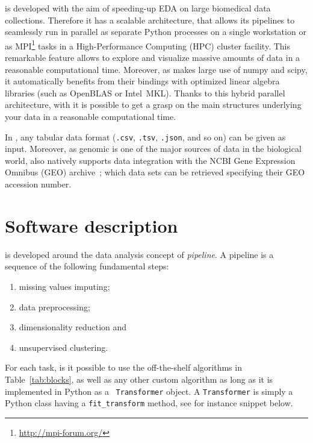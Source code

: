 \ade is developed with the aim of speeding-up EDA on large biomedical data collections.
Therefore it has a scalable architecture, that allows its pipelines to seamlessly run in parallel as separate Python processes on a single workstation or as MPI\footnote{\url{http://mpi-forum.org/}} tasks in a High-Performance Computing (HPC) cluster facility. This remarkable feature allows to explore and visualize massive amounts of data in a reasonable computational time.
Moreover, as \ade makes large use of {\sc numpy} and {\sc scipy}, it automatically benefits from their bindings with optimized linear algebra libraries (such as OpenBLAS or Intel\textsuperscript{\textregistered}~MKL).
Thanks to this hybrid parallel architecture, with \ade it is possible to get a grasp on the main structures underlying your data in a reasonable computational time.

In \ade, any tabular data format ({\tt .csv}, {\tt .tsv}, {\tt .json}, and so on) can be given as input. Moreover, as genomic is one of the major sources of data in the biological world, \ade also natively supports data integration with the NCBI Gene Expression Omnibus (GEO) archive~\cite{barrett2013ncbi}; which data sets can be retrieved specifying their GEO accession number.


\section{Software description} \label{sec:adenine_implementation}
\ade is developed around the data analysis concept of \emph{pipeline}. A pipeline is a sequence of the following fundamental steps:
\begin{enumerate}
  \item missing values imputing;
  \item data preprocessing;
  \item dimensionality reduction and
  \item unsupervised clustering.
\end{enumerate}
For each task, is it possible to use the off-the-shelf algorithms in Table~\ref{tab:blocks}, as well as any other custom algorithm as long as it is implemented in Python as a \sklearn~{\tt Transformer} object. A {\tt Transformer} is simply a Python class having a {\tt fit\_transform} method, see for instance snippet below.



